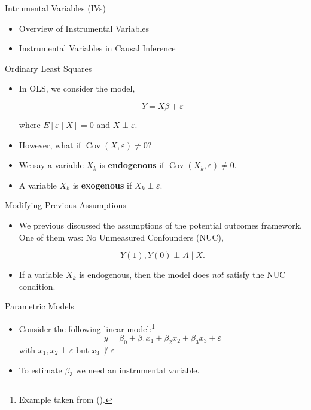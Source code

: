 \documentclass[handout]{beamer} %
\DeclareMathOperator*{\Cov}{Cov}
\begin{document}
\begin{frame}{Intrumental Variables (IVs)}

{

\begin{itemize}
    \item<1> Overview of Instrumental Variables
    \item<0> Instrumental Variables in Causal Inference
\end{itemize}
}

\end{frame}

\begin{frame}{Ordinary Least Squares}

\begin{itemize}
    \item<1-> In OLS, we consider the model,

      \begin{equation}\label{eq:ols}
      Y = X\beta + \varepsilon
      \end{equation}

      where $E[\varepsilon \mid X] = 0$ and $X \perp \varepsilon$.
    \item<2-> However, what if $\Cov(X, \varepsilon) \neq 0$?
    \item<3-> We say a variable $X_k$ is \textbf{endogenous} if $\Cov(X_k,
      \varepsilon) \neq 0$.
    \item<3-> A variable $X_k$ is \textbf{exogenous} if $X_k \perp \varepsilon$.
\end{itemize}

\end{frame}

\begin{frame}{Modifying Previous Assumptions}

\begin{itemize}
    \item We previous discussed the assumptions of the potential outcomes
      framework. One of them was: No Unmeasured Confounders (NUC),

      \[Y(1), Y(0) \perp A \mid X.\]

    \item If a variable $X_k$ is endogenous, then the model does \textit{not} 
      satisfy the NUC condition.
\end{itemize}

\end{frame}

\begin{frame}{Parametric Models}

\begin{itemize}
  \item Consider the following linear model:\footnote{Example taken from
    (\cite{wooldridge2010econometric}).}
      \[y = \beta_0 + \beta_1 x_1 + \beta_2 x_2 + \beta_3 x_3 + \varepsilon\]
      with $x_1, x_2 \perp \varepsilon$ but $x_3 \not\perp \varepsilon$
    \item To estimate $\beta_3$ we need an instrumental variable.
\end{itemize}

\end{frame}
\end{document}
